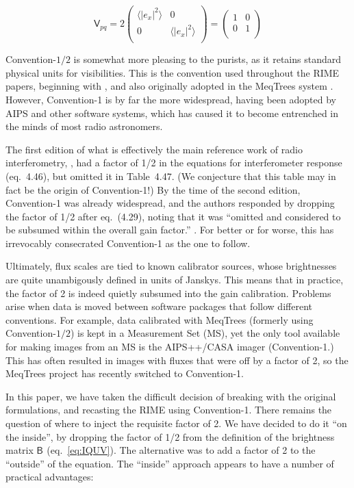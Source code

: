 \documentclass[]{aa}
\newcommand{\matrixtt}[4]{\left( \begin{array}{cc}#1&#2\\#3&#4\\\end{array} \right)}
\newcommand{\coh}[2]{\mathsf{{#1}}_{{#2}}}
\begin{document}
\[
\coh{V}{pq} = 2\matrixtt{\langle |e_x|^2\rangle }{0}{0}{\langle |e_x|^2\rangle } = \matrixtt{1}{0}{0}{1}
\]

Convention-$\scriptstyle 1/2$ is somewhat more pleasing to the purists, as it retains standard physical units for visibilities. This is the convention used throughout the RIME papers, beginning with \citet{ME1}, and also originally adopted in the MeqTrees system \citep{meqtrees}. However, Convention-1 is by far the more widespread, having been adopted by AIPS and other software systems, which has caused it to become entrenched in the minds of most radio astronomers.

The first edition of what is effectively the main reference work of radio interferometry, \citet*{tms1}, had a factor of 1/2 in the equations for interferometer response (eq.~4.46), but omitted it in Table~4.47. (We conjecture that this table may in fact be the origin of Convention-1!) By the time of the second edition, Convention-1 was already widespread, and the authors responded by dropping the factor of 1/2 after eq.~(4.29), noting that it was ``omitted and considered to be subsumed within the overall gain factor.'' \citep[see p. 102]{tms}. For better or for worse, this has irrevocably consecrated Convention-1 as the one to follow.

Ultimately, flux scales are tied to known calibrator sources, whose brightnesses are quite unambigously defined in units of Janskys. This means that in practice, the factor of 2 is indeed quietly subsumed into the gain calibration. Problems arise when data is moved between software packages that follow different conventions. For example, data calibrated with MeqTrees (formerly using  Convention-$\scriptstyle 1/2$) is kept in a Measurement Set (MS), yet the only tool available for making images from an MS is the AIPS++/CASA imager (Convention-1.) This has often resulted in images with fluxes that were off by a factor of 2, so the MeqTrees project has recently switched to Convention-1.

In this paper, we have taken the difficult decision of breaking with the original formulations, and recasting the RIME using Convention-1. There remains the question of where to inject the requisite factor of 2. We have decided to do it ``on the inside'', by dropping the factor of 1/2 from the \citet{ME4} definition of the brightness matrix $\coh{B}{}$ (eq.~\ref{eq:IQUV}). The alternative was to add a factor of 2 to the ``outside'' of the equation. The ``inside'' approach appears to have a number of practical advantages:
\end{document}
